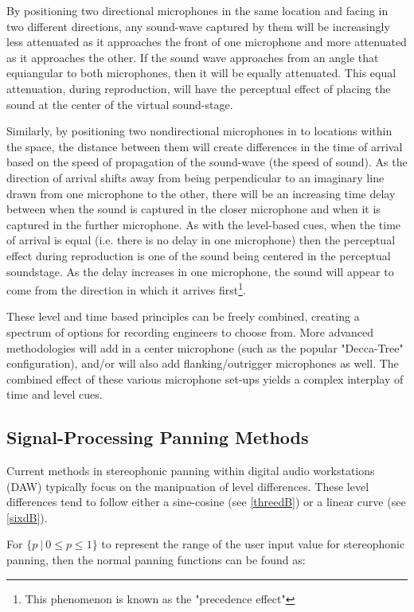 By positioning two directional microphones in the same location and facing in two different directions, any sound-wave captured by them will be increasingly less attenuated as it approaches the front of one microphone and more attenuated as it approaches the other. If the sound wave approaches from an angle that equiangular to both microphones, then it will be equally attenuated. This equal attenuation, during reproduction, will have the perceptual effect of placing the sound at the center of the virtual sound-stage. 

Similarly, by positioning two nondirectional microphones in to locations within the space, the distance between them will create differences in the time of arrival based on the speed of propagation of the sound-wave (the speed of sound). As the direction of arrival shifts away from being perpendicular to an imaginary line drawn from one microphone to the other, there will be an increasing time delay between when the sound is captured in the closer microphone and when it is captured in the further microphone. As with the level-based cues, when the time of arrival is equal (i.e. there is no delay in one microphone) then the perceptual effect during reproduction is one of the sound being centered in the perceptual soundstage. As the delay increases in one microphone, the sound will appear to come from the direction in which it arrives first\footnote{This phenomenon is known as the "precedence effect"}.

These level and time based principles can be freely combined, creating a spectrum of options for recording engineers to choose from. More advanced methodologies will add in a center microphone (such as the popular "Decca-Tree" configuration), and/or will also add flanking/outrigger microphones as well. The combined effect of these various microphone set-ups yields a complex interplay of time and level cues.

\subsection{Signal-Processing Panning Methods}

Current methods in stereophonic panning within digital audio workstations (DAW) typically focus on the manipuation of level differences. These level differences tend to follow either a sine-cosine (see \ref{threedB}) or a linear curve (see \ref{sixdB}).

For $\{p \: | \: 0 \leq p \leq 1\}$ to represent the range of the user input value for stereophonic panning, then the normal panning functions can be found as:

